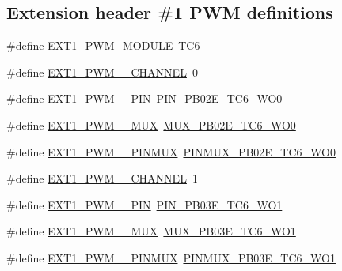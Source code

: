 \subsection*{Extension header \#1 P\+WM definitions}
\begin{DoxyCompactItemize}
\item 
\#define \mbox{\hyperlink{group__samd21__xplained__pro__features__group_ga17be406af2b3ea3f95811b573de0b4a8}{E\+X\+T1\+\_\+\+P\+W\+M\+\_\+\+M\+O\+D\+U\+LE}}~\mbox{\hyperlink{group___s_a_m_d21_j18_a__base_gae5a1efa96ea067fb3907f342aa6fb0a4}{T\+C6}}
\item 
\#define \mbox{\hyperlink{group__samd21__xplained__pro__features__group_ga60838473cc32e6d0ba4751e3a2f1b5c0}{E\+X\+T1\+\_\+\+P\+W\+M\+\_\+\_\+\+C\+H\+A\+N\+N\+EL}}~0
\item 
\#define \mbox{\hyperlink{group__samd21__xplained__pro__features__group_ga9aa2d5165f8d3906e4910d119ef59980}{E\+X\+T1\+\_\+\+P\+W\+M\+\_\+\_\+\+P\+IN}}~\mbox{\hyperlink{pio_2samd21j18a_8h_a89450ffd1e32e588e58d3a4c2f97d7b4}{P\+I\+N\+\_\+\+P\+B02\+E\+\_\+\+T\+C6\+\_\+\+W\+O0}}
\item 
\#define \mbox{\hyperlink{group__samd21__xplained__pro__features__group_gac923210c50489df59fac85fcfc6d945f}{E\+X\+T1\+\_\+\+P\+W\+M\+\_\+\_\+\+M\+UX}}~\mbox{\hyperlink{pio_2samd21j18a_8h_a335485d7f34d2e34ce5c00dc9bfb38eb}{M\+U\+X\+\_\+\+P\+B02\+E\+\_\+\+T\+C6\+\_\+\+W\+O0}}
\item 
\#define \mbox{\hyperlink{group__samd21__xplained__pro__features__group_ga01ad2224572edd5f5b0dafe90483d462}{E\+X\+T1\+\_\+\+P\+W\+M\+\_\+\_\+\+P\+I\+N\+M\+UX}}~\mbox{\hyperlink{pio_2samd21j18a_8h_a51cfc2e2d80835238970f5d896a35dda}{P\+I\+N\+M\+U\+X\+\_\+\+P\+B02\+E\+\_\+\+T\+C6\+\_\+\+W\+O0}}
\item 
\#define \mbox{\hyperlink{group__samd21__xplained__pro__features__group_ga9b01ee479eda0b3b277d642a20ed6aea}{E\+X\+T1\+\_\+\+P\+W\+M\+\_\+\_\+\+C\+H\+A\+N\+N\+EL}}~1
\item 
\#define \mbox{\hyperlink{group__samd21__xplained__pro__features__group_gac6e4f49ec7746526fe33fb5dd1ea81d4}{E\+X\+T1\+\_\+\+P\+W\+M\+\_\+\_\+\+P\+IN}}~\mbox{\hyperlink{pio_2samd21j18a_8h_a736f98c161da8fef1fb8087a188d243d}{P\+I\+N\+\_\+\+P\+B03\+E\+\_\+\+T\+C6\+\_\+\+W\+O1}}
\item 
\#define \mbox{\hyperlink{group__samd21__xplained__pro__features__group_ga435963249a60452bf2a3c8d80864c168}{E\+X\+T1\+\_\+\+P\+W\+M\+\_\+\_\+\+M\+UX}}~\mbox{\hyperlink{pio_2samd21j18a_8h_ac6e26e387280a981122aaafe807aafc4}{M\+U\+X\+\_\+\+P\+B03\+E\+\_\+\+T\+C6\+\_\+\+W\+O1}}
\item 
\#define \mbox{\hyperlink{group__samd21__xplained__pro__features__group_gafcac80f976e726c2f8f6aa3977a6a931}{E\+X\+T1\+\_\+\+P\+W\+M\+\_\+\_\+\+P\+I\+N\+M\+UX}}~\mbox{\hyperlink{pio_2samd21j18a_8h_a703285f8061e59e447973eb6547be57c}{P\+I\+N\+M\+U\+X\+\_\+\+P\+B03\+E\+\_\+\+T\+C6\+\_\+\+W\+O1}}
\end{DoxyCompactItemize}
